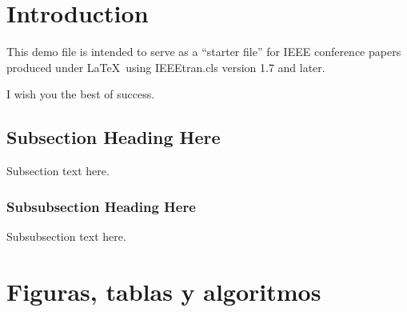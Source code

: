
\section{Introduction}
This demo file is intended to serve as a ``starter file''
for IEEE conference papers produced under \LaTeX\ using
IEEEtran.cls version 1.7 and later.

I wish you the best of success.

\subsection{Subsection Heading Here}
Subsection text here.

\subsubsection{Subsubsection Heading Here}
Subsubsection text here.

\section{Figuras, tablas y algoritmos}
\label{sec:figuras-tablas-algoritmos}
